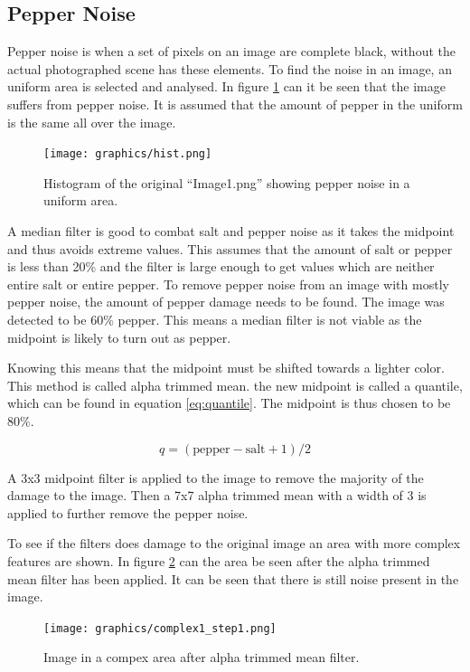 \subsection{Pepper Noise}\label{image_1}
Pepper noise is when a set of pixels on an image are complete black, without the actual photographed scene has these elements.
To find the noise in an image, an uniform area is selected and analysed.
In figure \ref{fig:hist_pepper_im01} can it be seen that the image suffers from pepper noise.
It is assumed that the amount of pepper in the uniform is the same all over the image.

\begin{figure}[H]
\texttt{[image: graphics/hist.png]}
\caption{Histogram of the original ``Image1.png'' showing pepper noise in a uniform area.}
\label{fig:hist_pepper_im01}
\end{figure}

A median filter is good to combat salt and pepper noise as it takes the midpoint and thus avoids extreme values.
This assumes that the amount of salt or pepper is less than 20\% and the filter is large enough to get values which are neither entire salt or entire pepper.
To remove pepper noise from an image with mostly pepper noise, the amount of pepper damage needs to be found.
The image was detected to be 60\% pepper.
This means a median filter is not viable as the midpoint is likely to turn out as pepper.

Knowing this means that the midpoint must be shifted towards a lighter color.
This method is called alpha trimmed mean.
the new midpoint is called a quantile, which can be found in equation \ref{eq:quantile}.
The midpoint is thus chosen to be 80\%. 

\begin{equation}
 q = (\text{pepper}-\text{salt}+1)/2 \label{eq:quantile}
\end{equation}

A 3x3 midpoint filter is applied to the image to remove the majority of the damage to the image.
Then a 7x7 alpha trimmed mean with a width of 3 is applied to further remove the pepper noise.

To see if the filters does damage to the original image an area with more complex features are shown.
In figure \ref{fig:complex1_after_alpha} can the area be seen after the alpha trimmed mean filter has been applied.
It can be seen that there is still noise present in the image.

\begin{figure}[H]
\texttt{[image: graphics/complex1\_step1.png]}
\caption{Image in a compex area after alpha trimmed mean filter.}
\label{fig:complex1_after_alpha}
\end{figure}

